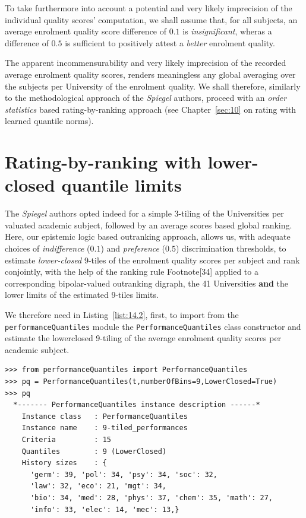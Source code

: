 To take furthermore into account a potential and very likely imprecision of the individual quality scores' computation, we shall assume that, for all subjects, an average enrolment quality score difference of $0.1$ is \emph{insignificant}, wheras a difference of $0.5$ is sufficient to positively attest a \emph{better} enrolment quality.

The apparent incommensurability and very likely imprecision of the recorded average enrolment quality scores, renders meaningless any global averaging over the subjects per University of the enrolment quality. We shall therefore, similarly to the methodological approach of the \emph{Spiegel} authors, proceed with an \emph{order statistics} based rating-by-ranking approach (see Chapter~\vref{sec:10} on rating with learned quantile norms).

\section{Rating-by-ranking with lower-closed quantile limits}
\label{sec:14.1}

The \emph{Spiegel} authors opted indeed for a simple 3-tiling of the Universities per valuated academic subject, followed by an average \Borda scores based global ranking. Here, our epistemic logic based outranking approach, allows us, with adequate choices of \emph{indifference} ($0.1$) and \emph{preference} ($0.5$) discrimination thresholds, to estimate \emph{lower-closed} 9-tiles of the enrolment quality scores per subject and rank conjointly, with the help of the \Copeland ranking rule Footnote[34] applied to a corresponding bipolar-valued outranking digraph, the 41 Universities \textbf{and} the lower limits of the estimated 9-tiles limits.

We therefore need in Listing~\vref{list:14.2}, first, to import from the \texttt{performanceQuan\-tiles} module the \texttt{PerformanceQuantiles} class constructor  and estimate the lowerclosed 9-tiling of the average enrolment quality scores per academic subject.
\begin{lstlisting}[caption={Computing 9-tiles of the enrolment quality scores per subject},label=list:14.2]
>>> from performanceQuantiles import PerformanceQuantiles
>>> pq = PerformanceQuantiles(t,numberOfBins=9,LowerClosed=True)
>>> pq
  *------- PerformanceQuantiles instance description ------*
    Instance class   : PerformanceQuantiles
    Instance name    : 9-tiled_performances
    Criteria         : 15
    Quantiles        : 9 (LowerClosed)
    History sizes    : {
      'germ': 39, 'pol': 34, 'psy': 34, 'soc': 32,
      'law': 32, 'eco': 21, 'mgt': 34,
      'bio': 34, 'med': 28, 'phys': 37, 'chem': 35, 'math': 27,
      'info': 33, 'elec': 14, 'mec': 13,}
\end{lstlisting}

